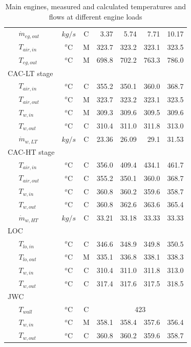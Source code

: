 \documentclass[preprint,12pt]{elsarticle}
\begin{document}
\begin{table}
\begin{tabular}{llccrrrr}
		&	$\dot{m}_{eg,out}$  & $kg/s$ & C  & 3.37 & 5.74 & 7.71 & 10.17 \\
		&	$T_{air,in}$  		& $^o$C & M  & 323.7 & 323.2 & 323.1 & 323.5 \\ 
		&	$T_{eg,out}$  		& $^o$C & M  & 698.8 & 702.2 & 763.3 & 786.0 \\ 
		\multicolumn{2}{l}{CAC-LT stage} & & & & & &  \\
		&	$T_{air,in}$  		& $^o$C & C  & 355.2 & 350.1 & 360.0 & 368.7 \\ 
		&	$T_{air,out}$ 		& $^o$C & M  & 323.7 & 323.2 & 323.1 & 323.5 \\
		&	$T_{w,in}$   		& $^o$C & M  & 309.3 & 309.6 & 309.5 & 309.6 \\
		&	$T_{w,out}$   		& $^o$C & C  & 310.4 & 311.0 & 311.8 & 313.0 \\  
		& 	$\dot{m}_{w,LT}$  	& $kg/s$ & C& 23.36 & 26.09 & 29.1 & 31.53 \\
		\multicolumn{2}{l}{CAC-HT stage} & & & & & & \\
		&	$T_{air,in}$   		& $^o$C & C  & 356.0 & 409.4 & 434.1 & 461.7 \\
		&	$T_{air,out}$   	& $^o$C & C  & 355.2 & 350.1 & 360.0 & 368.7 \\ 
		&	$T_{w,in}$    		& $^o$C & C  & 360.8 & 360.2 & 359.6 & 358.7 \\ 
		&	$T_{w,out}$   		& $^o$C & C  & 360.8 & 362.6 & 363.6 & 365.4 \\
		& 	$\dot{m}_{w,HT}$  	& $kg/s$ & C & 33.21 & 33.18 & 33.33 & 33.33 \\
		\multicolumn{2}{l}{LOC} & & & & & &  \\
		&	$T_{lo,in}$   		& $^o$C & C  &346.6 & 348.9 & 349.8 & 350.5 \\ 
		&	$T_{lo,out}$    	& $^o$C & M  & 335.1 & 336.8 & 338.1 & 338.3 \\ 
		&	$T_{w,in}$    		& $^o$C & C  & 310.4 & 311.0 & 311.8 & 313.0 \\
		&	$T_{w,out}$   		& $^o$C & C  & 317.4 & 317.6 & 317.5 & 318.5 \\ 
		\multicolumn{2}{l}{JWC} & & & & & &  \\
		&	$T_{wall}$    		& $^o$C & C  & \multicolumn{4}{c}{423}  \\ 
		&	$T_{w,in}$    		& $^o$C & M  & 358.1 & 358.4 & 357.6 & 356.4 \\ 
		&	$T_{w,out}$	   		& $^o$C & C  & 360.8 & 360.2 & 359.6 & 358.7 \\ 
		\bottomrule
	\end{tabular}
	\caption{Main engines, measured and calculated temperatures and flows at different engine loads}
	\label{tab:ME_values}
\end{table}
\end{document}
